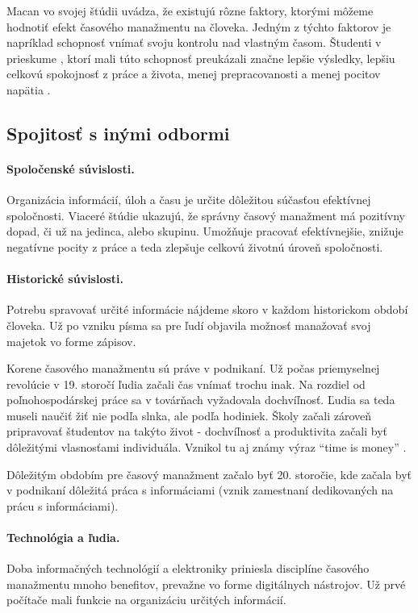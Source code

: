 \documentclass[10pt,slovak,a4paper]{article}
\begin{document}
		Macan \cite{Macan} vo svojej štúdii uvádza, že existujú rôzne faktory, ktorými môžeme hodnotiť efekt časového manažmentu na človeka. Jedným  z týchto faktorov je napríklad schopnosť vnímať svoju kontrolu nad vlastným časom. Študenti v prieskume \cite{Macan}, ktorí mali túto schopnosť preukázali značne lepšie výsledky, lepšiu celkovú spokojnosť z práce a života, menej prepracovanosti a menej pocitov napätia \cite{Macan}.
		
	\subsection{Spojitosť s inými odbormi}
		
		\paragraph{Spoločenské súvislosti.\\}
		Organizácia informácií, úloh a času je určite dôležitou súčasťou efektívnej spoločnosti. Viaceré štúdie \cite{Macan} ukazujú, že správny časový manažment má pozitívny dopad, či už na jedinca, alebo skupinu. Umožňuje pracovať efektívnejšie, znižuje negatívne pocity z práce a teda zlepšuje celkovú životnú úroveň spoločnosti.
		
		\paragraph{Historické súvislosti.\\}
		Potrebu spravovať určité informácie nájdeme skoro v každom historickom období človeka. Už po vzniku písma sa pre ľudí objavila možnosť manažovať svoj majetok vo forme zápisov.
		
		Korene časového manažmentu sú práve v podnikaní. Už počas priemyselnej revolúcie v 19. storočí ľudia začali čas vnímať trochu inak. Na rozdiel od poľnohospodárskej práce sa v továrňach vyžadovala dochvíľnosť. Ľudia sa teda museli naučiť žiť nie podľa slnka, ale podľa hodiniek. Školy začali zároveň pripravovať študentov na takýto život - dochvíľnosť a produktivita začali byť dôležitými vlasnosťami individuála. Vznikol tu aj známy výraz \enquote{time is money} \cite{TimeMagHisto}.
		
		Dôležitým obdobím pre časový manažment začalo byť 20. storočie, kde začala byť v podnikaní dôležitá práca s informáciami (vznik zamestnaní dedikovaných na prácu s informáciami).
		
		\paragraph{Technológia a ľudia.}
		Doba informačných technológií a elektroniky priniesla disciplíne časového manažmentu mnoho benefitov, prevažne vo forme digitálnych nástrojov. Už prvé počítače mali funkcie na organizáciu určitých informácií. 
		
\end{document}
